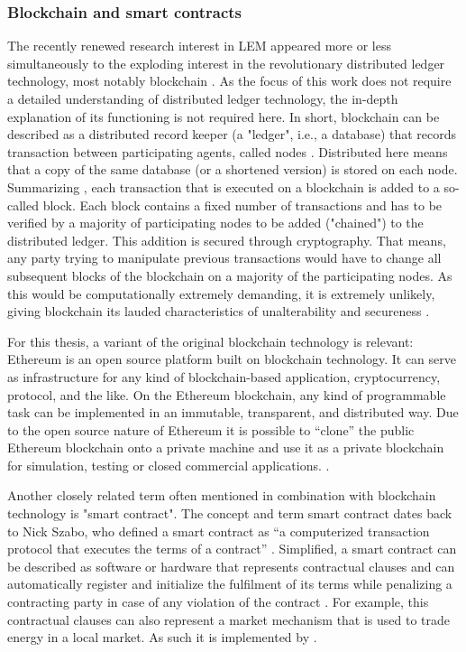 \subsubsection{Blockchain and smart contracts}

The recently renewed research interest in LEM appeared more or less simultaneously to the exploding interest in the revolutionary distributed ledger technology, most notably blockchain \citep{Swan:2015}. As the focus of this work does not require a detailed understanding of distributed ledger technology, the in-depth explanation of its functioning is not required here. In short, blockchain can be described as a distributed record keeper (a "ledger", i.e., a database) that records transaction between participating agents, called nodes \citep{Burger:2016}. Distributed here means that a copy of the same database (or a shortened version) is stored on each node. Summarizing \citet{Tapscott:2016}, each transaction that is executed on a blockchain is added to a so-called block. Each block contains a fixed number of transactions and has to be verified by a majority of participating nodes to be added ("chained") to the distributed ledger. This addition is secured through cryptography. That means, any party trying to manipulate previous transactions would have to change all subsequent blocks of the blockchain on a majority of the participating nodes. As this would be computationally extremely demanding, it is extremely unlikely, giving blockchain its lauded characteristics of unalterability and secureness \citep{Burger:2016}.

For this thesis, a variant of the original blockchain technology is relevant: Ethereum is an open source platform built on blockchain technology. It can serve as infrastructure for any kind of blockchain-based application, cryptocurrency, protocol, and the like. On the Ethereum blockchain, any kind of programmable task can be implemented in an immutable, transparent, and distributed way. Due to the open source nature of Ethereum it is possible to “clone” the public Ethereum blockchain onto a private machine and use it as a private blockchain for simulation, testing or closed commercial applications. \citep{Ethereum:2018doc, Swan:2015}.

Another closely related term often mentioned in combination with blockchain technology is "smart contract". The concept and term smart contract dates back to Nick Szabo, who defined a smart contract as “a computerized transaction protocol that executes the terms of a contract” \citep{szabo:1994}. Simplified, a smart contract can be described as software or hardware that represents contractual clauses and can automatically register and initialize the fulfilment of its terms while penalizing a contracting party in case of any violation of the contract \citep{Szabo:1997}. For example, this contractual clauses can also represent a market mechanism that is used to trade energy in a local market. As such it is implemented by \citet{Mengelkamp:2018a}.


